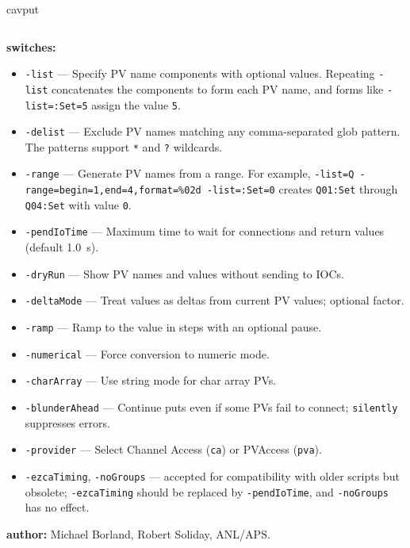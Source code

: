 \begin{sddsprog}{cavput}
\begin{verbatim}
\end{verbatim}
\item \textbf{switches:}
\begin{itemize}
  \item {\tt -list} --- Specify PV name components with optional values. Repeating
    \verb+-list+ concatenates the components to form each PV name, and
    forms like \verb+-list=:Set=5+ assign the value \verb+5+.
  \item {\tt -delist} --- Exclude PV names matching any comma-separated glob
    pattern. The patterns support \verb+*+ and \verb+?+ wildcards.
  \item {\tt -range} --- Generate PV names from a range. \newline
    For example, \verb+-list=Q -range=begin=1,end=4,format=%02d -list=:Set=0+ \newline
    creates \verb+Q01:Set+ through \verb+Q04:Set+ with value \verb+0+.
  \item {\tt -pendIoTime} --- Maximum time to wait for connections and return values (default 1.0~s).
  \item {\tt -dryRun} --- Show PV names and values without sending to IOCs.
  \item {\tt -deltaMode} --- Treat values as deltas from current PV values; optional factor.
  \item {\tt -ramp} --- Ramp to the value in steps with an optional pause.
  \item {\tt -numerical} --- Force conversion to numeric mode.
  \item {\tt -charArray} --- Use string mode for char array PVs.
  \item {\tt -blunderAhead} --- Continue puts even if some PVs fail to connect; \verb|silently| suppresses errors.
  \item {\tt -provider} --- Select Channel Access ({\tt ca}) or PVAccess ({\tt pva}).
  \item {\tt -ezcaTiming}, {\tt -noGroups} --- accepted for compatibility
    with older scripts but obsolete; \verb+-ezcaTiming+ should be replaced by
    \verb+-pendIoTime+, and \verb+-noGroups+ has no effect.
\end{itemize}
\item \textbf{author:} Michael Borland, Robert Soliday, ANL/APS.
\end{sddsprog}
